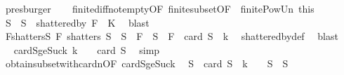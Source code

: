\begin{isabellebody}
\ presburger\isanewline
\isanewline
\ \ \isamarkupfalse%
\ finite{\isacharunderscore}{\kern0pt}diff{\isacharunderscore}{\kern0pt}not{\isacharunderscore}{\kern0pt}empty{\isacharbrackleft}{\kern0pt}OF\ finite{\isacharunderscore}{\kern0pt}subset{\isacharbrackleft}{\kern0pt}OF\ {\isacharunderscore}{\kern0pt}\ finite{\isacharunderscore}{\kern0pt}Pow{\isacharunderscore}{\kern0pt}Un{\isacharbrackright}{\kern0pt}\ this{\isacharbrackright}{\kern0pt}\ \isanewline
\ \ \isamarkupfalse%
\ S\ \ {\isachardoublequoteopen}S\ {\isasymin}\ shattered{\isacharunderscore}{\kern0pt}by\ F\ {\isacharminus}{\kern0pt}\ {\isacharquery}{\kern0pt}K{\isachardoublequoteclose}\ \isamarkupfalse%
\ blast\isanewline
\ \ \isamarkupfalse%
\ \isamarkupfalse%
\ F{\isacharunderscore}{\kern0pt}shatters{\isacharunderscore}{\kern0pt}S{\isacharcolon}{\kern0pt}\ {\isachardoublequoteopen}F\ shatters\ S{\isachardoublequoteclose}\ \ {\isachardoublequoteopen}S\ {\isasymsubseteq}\ {\isasymUnion}F{\isachardoublequoteclose}\ \ {\isachardoublequoteopen}{\isasymnot}{\isacharparenleft}{\kern0pt}S\ {\isasymsubseteq}\ {\isasymUnion}F\ {\isasymand}\ card\ S\ {\isasymle}\ k{\isacharparenright}{\kern0pt}{\isachardoublequoteclose}\ \isamarkupfalse%
\ shattered{\isacharunderscore}{\kern0pt}by{\isacharunderscore}{\kern0pt}def\ \isamarkupfalse%
\ blast{\isacharplus}{\kern0pt}\isanewline
\ \ \isamarkupfalse%
\ \isamarkupfalse%
\ card{\isacharunderscore}{\kern0pt}S{\isacharunderscore}{\kern0pt}ge{\isacharunderscore}{\kern0pt}Suc{\isacharunderscore}{\kern0pt}k{\isacharcolon}{\kern0pt}\ {\isachardoublequoteopen}k\ {\isacharplus}{\kern0pt}\ {}\ {\isasymle}\ card\ S{\isachardoublequoteclose}\ \isamarkupfalse%
\ simp\isanewline
\ \ \isamarkupfalse%
\ obtain{\isacharunderscore}{\kern0pt}subset{\isacharunderscore}{\kern0pt}with{\isacharunderscore}{\kern0pt}card{\isacharunderscore}{\kern0pt}n{\isacharbrackleft}{\kern0pt}OF\ card{\isacharunderscore}{\kern0pt}S{\isacharunderscore}{\kern0pt}ge{\isacharunderscore}{\kern0pt}Suc{\isacharunderscore}{\kern0pt}k{\isacharbrackright}{\kern0pt}\ \isamarkupfalse%
\ S{\isacharprime}{\kern0pt}\ \ {\isachardoublequoteopen}card\ S{\isacharprime}{\kern0pt}\ {\isacharequal}{\kern0pt}\ k\ {\isacharplus}{\kern0pt}\ {}{\isachardoublequoteclose}\ \ {\isachardoublequoteopen}S{\isacharprime}{\kern0pt}\ {\isasymsubseteq}\ S{\isachardoublequoteclose}\ \isamarkupfalse%

\end{isabellebody}
